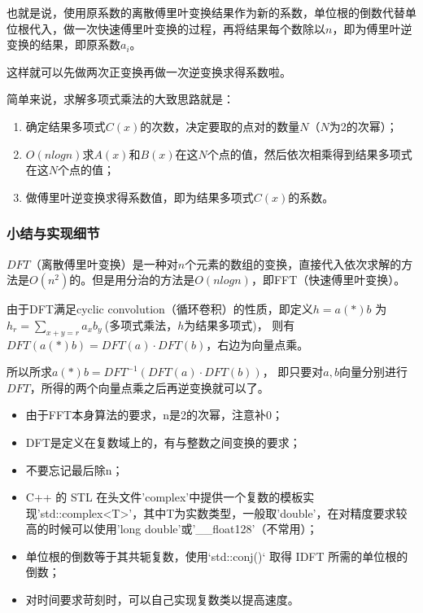 也就是说，{\heiti 使用原系数的离散傅里叶变换结果作为新的系数，单位根的倒数代替单位根代入，做一次快速傅里叶变换的过程，再将结果每个数除以$n$}，即为傅里叶逆变换的结果，即原系数$a_i$。

这样就可以先做两次正变换再做一次逆变换求得系数啦。

简单来说，求解多项式乘法的大致思路就是：

\begin{enumerate}
\item 确定结果多项式$C(x)$的次数，决定要取的点对的数量$N$（$N$为2的次幂）；
\item $O(nlogn)$求$A(x)$和$B(x)$在这$N$个点的值，然后依次相乘得到结果多项式在这$N$个点的值；  
\item 做傅里叶逆变换求得系数值，即为结果多项式$C(x)$的系数。
\end{enumerate}

\subsubsection{小结与实现细节}
$DFT$（离散傅里叶变换）是一种对$n$个元素的数组的变换，直接代入依次求解的方法是$O(n^2)$的。但是用分治的方法是$O(nlogn)$，即FFT（快速傅里叶变换）。

由于DFT满足{\heiti cyclic convolution（循环卷积）}的性质，即定义$h=a (*) b$  为$h_r=\sum_{x+y=r}a_xb_y\ $(多项式乘法，$h$为结果多项式)，
则有$DFT(a (*) b)=DFT(a)\cdot DFT(b)$，右边为向量点乘。

所以所求$a (*) b=DFT^{-1}(DFT(a)\cdot DFT(b))$，
即只要对$a,b$向量分别进行$DFT$，所得的两个向量点乘之后再逆变换就可以了。

\begin{note}
\begin{itemize}
\item 由于FFT本身算法的要求，n是2的次幂，注意补0；
\item DFT是定义在复数域上的，有与整数之间变换的要求；
\item 不要忘记最后除n；
\item C++ 的 STL 在头文件'complex'中提供一个复数的模板实现'std::complex<T>'，其中T为实数类型，一般取'double'，在对精度要求较高的时候可以使用'long double'或'\_\_float128'（不常用）；
\item 单位根的倒数等于其共轭复数，使用`std::conj()` 取得 IDFT 所需的单位根的倒数；
\item 对时间要求苛刻时，可以自己实现复数类以提高速度。
\end{itemize}
\end{note}



